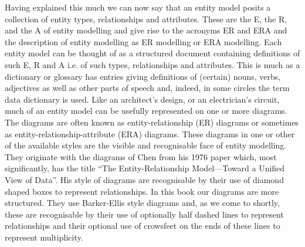 \mynote Having explained this much we can now say that an entity model posits a collection of entity types, relationships and attributes. These are the E, the R, and the A of entity modelling and give rise to the acronyms ER and ERA and the description of entity modelling as ER modelling or ERA modelling.
Each entity model can be thought of as a structured document containing definitions of such  
E, R and A i.e. of such types, relationships and attributes. 
This is much  as a dictionary or glossary has entries giving definitions of (certain) nouns, verbs, adjectives as well as other parts of speech and, indeed, in some circles the term data dictionary is used. Like an architect's design, or an electrician's circuit, much of an entity model can be usefully represented on one or more diagrams. The diagrams are often known as entity-relationship (ER) diagrams or sometimes as  entity-relationship-attribute (ERA) diagrams. 
These diagrams in one or other of the available styles are the visible and recognisable face of entity modelling. They originate with the diagrams of Chen from his 1976 paper which, most significantly, has the title ``The Entity-Relationship Model---Toward a Unified View of Data''. His style of diagrams are recognisable by their use of diamond shaped boxes to represent relationships. In this book our diagrams are more structured. They use Barker-Ellis style diagrams and, as we come to shortly, these are recognisable by their use of optionally half dashed lines to represent relationships and their optional use of crowsfeet on the ends of these lines to represent multiplicity. 


